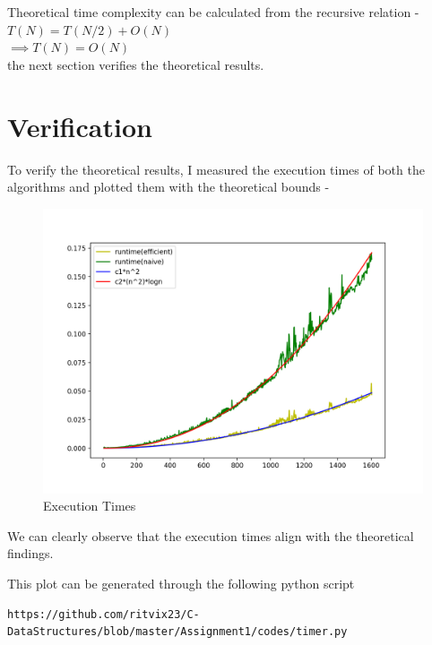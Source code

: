 \documentclass[journal,12pt,twocolumn]{IEEEtran}
\begin{document}
Theoretical time complexity can be calculated from the recursive relation - \\
$T(N)  = T(N/2) + O(N)$ \\
$\implies T(N) = O(N)$ \\
the next section  verifies the theoretical results. 
\section{Verification}
To verify the theoretical results, I measured the execution times of both the algorithms and plotted them with the theoretical bounds - 

\begin{figure}[!h]
    \centering
    \includegraphics[scale=0.5]{plots/verification.png}
    \caption{Execution Times}
    \label{fig:verification}
\end{figure}

We can clearly observe that the execution times align with the theoretical findings.

This plot can be generated through the following python script
\begin{lstlisting}
https://github.com/ritvix23/C-DataStructures/blob/master/Assignment1/codes/timer.py
\end{lstlisting}
\end{document}
